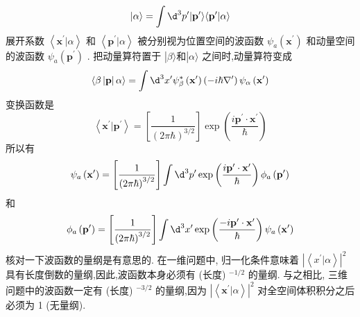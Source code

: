 \documentclass[lang=cn,newtx,10pt,scheme=chinese,thmcnt=section]{elegantbook}
\begin{document}
\begin{equation}
	| {\alpha \rangle = \int {\d}^{3}{p}^{\prime }}| {\mathbf{p}}^{\prime }\rangle \langle {{\mathbf{p}}^{\prime } | \alpha }\rangle
\end{equation}
展开系数 $\left\langle {{\mathbf{x}}^{\prime } | \alpha }\right\rangle$ 和 $\left\langle {{\mathbf{p}}^{\prime } | \alpha }\right\rangle$ 被分别视为位置空间的波函数 ${\psi }_{a}\left( {\mathbf{x}}^{\prime }\right)$ 和动量空间的波函数 ${\psi }_{a}\left( {\mathbf{p}}^{\prime }\right)$ . 把动量算符置于 $\left| {\beta \rangle \text{和}}\right| \alpha \rangle$ 之间时,动量算符变成
\begin{equation}
	\langle \beta \left| \mathbf{p}\right| \alpha \rangle = \int {\d}^{3}{x}^{\prime }{\psi }_{\beta }^{ * }\left( {\mathbf{x}}^{\prime }\right) \left( {-i\hbar {\nabla }^{\prime }}\right) {\psi }_{\alpha }\left( {\mathbf{x}}^{\prime }\right)
\end{equation}
变换函数是
\begin{equation}
	\left\langle {{\mathbf{x}}^{\prime } | {\mathbf{p}}^{\prime }}\right\rangle = \left\lbrack \frac{1}{{\left( 2\pi \hbar \right) }^{3/2}}\right\rbrack \exp \left( \frac{i{\mathbf{p}}^{\prime } \cdot {\mathbf{x}}^{\prime }}{\hbar }\right)
\end{equation}
所以有
\begin{equation}
	{\psi }_{a}\left( {\mathbf{x}}^{\prime }\right) = \left\lbrack \frac{1}{{\left( 2\pi \hbar \right) }^{3/2}}\right\rbrack \int {\d}^{3}{p}^{\prime }\exp \left( \frac{i{\mathbf{p}}^{\prime } \cdot {\mathbf{x}}^{\prime }}{\hbar }\right) {\phi }_{a}\left( {\mathbf{p}}^{\prime }\right)
\end{equation}
和
\begin{equation}
	{\phi }_{a}\left( {\mathbf{p}}^{\prime }\right) = \left\lbrack \frac{1}{{\left( 2\pi \hbar \right) }^{3/2}}\right\rbrack \int {\d}^{3}{x}^{\prime }\exp \left( \frac{-i{\mathbf{p}}^{\prime } \cdot {\mathbf{x}}^{\prime }}{\hbar }\right) {\psi }_{a}\left( {\mathbf{x}}^{\prime }\right)
\end{equation}
核对一下波函数的量纲是有意思的. 在一维问题中, 归一化条件意味着 ${\left| \left\langle {x}^{\prime } | \alpha \right\rangle \right| }^{2}$ 具有长度倒数的量纲,因此,波函数本身必须有 (长度) ${}^{-1/2}$ 的量纲. 与之相比, 三维问题中的波函数一定有 (长度) ${}^{-3/2}$ 的量纲,因为 ${\left| \left\langle {\mathbf{x}}^{\prime } | \alpha \right\rangle \right| }^{2}$ 对全空间体积积分之后必须为 1 (无量纲).
\end{document}
